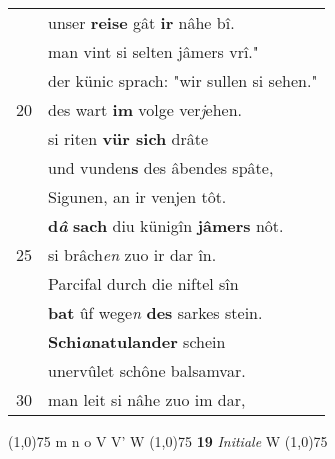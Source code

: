\documentclass[8pt,a4paper,notitlepage]{article}
\begin{document}
\begin{table}[ht]
\begin{minipage}[t]{0.5\linewidth}
\begin{tabular}{rl}
 & unser \textbf{reise} gât \textbf{ir} nâhe bî.\\ 
 & man vint si selten jâmers vrî."\\ 
 & der künic sprach: "wir sullen si sehen."\\ 
20 & des wart \textbf{im} volge ver\textit{j}ehen.\\ 
 & si riten \textbf{vür sich} drâte\\ 
 & und vunden\textbf{s} des âbendes spâte,\\ 
 & Sigunen, an ir venjen tôt.\\ 
 & \textbf{d\textit{â}} \textbf{sach} diu künigîn \textbf{jâmers} nôt.\\ 
25 & si brâch\textit{en} zuo ir dar în.\\ 
 & Parcifal durch die niftel sîn\\ 
 & \textbf{bat} ûf wege\textit{n} \textbf{des} sarkes stein.\\ 
 & \textbf{Schi\textit{a}natulander} schein\\ 
 & unervûlet schône balsamvar.\\ 
30 & man leit si nâhe zuo im dar,\\ 
\end{tabular}
\scriptsize
\line(1,0){75} \newline
m n o V V' W \newline
\line(1,0){75} \newline
\textbf{19} \textit{Initiale} W  \newline
\line(1,0){75} \newline

\end{minipage}
\end{table}
\end{document}
